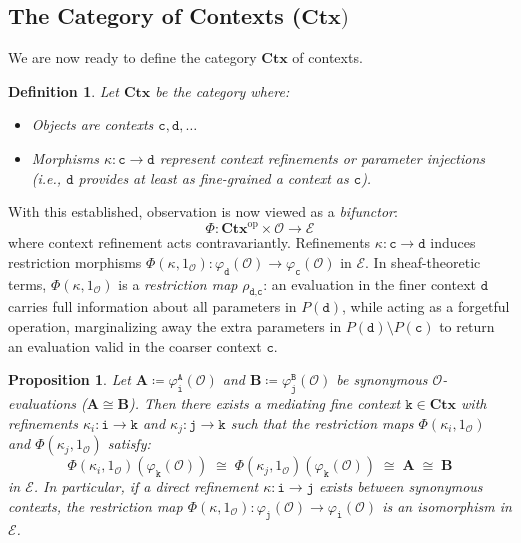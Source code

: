 \documentclass{article}
\newtheorem{dn}{Definition}
\newtheorem{pp}{Proposition}
\numberwithin{tm}{section}
\numberwithin{dn}{section}
\numberwithin{as}{section}
\numberwithin{rk}{section}
\numberwithin{lem}{section}
\numberwithin{ax}{section}
\numberwithin{pp}{section}
\numberwithin{eg}{section}
\numberwithin{war}{section}
\numberwithin{equation}{section}
\numberwithin{prop}{section}
\numberwithin{nt}{section}
\numberwithin{rc}{section}
\def\code#1{\texttt{#1}}
\begin{document}
\subsection{The Category of Contexts ($\mathbf{Ctx})$}
We are now ready to define the category $\mathbf{Ctx}$ of contexts.
\begin{dn}
	Let $\mathbf{Ctx}$ be the category where:
	\begin{itemize}
		\item Objects are contexts $\code{c}, \code{d}, \dots$
		\item Morphisms $\kappa: \code{c} \to \code{d}$ represent \emph{context refinements} or \emph{parameter injections} (i.e., $\code{d}$ provides at least as fine-grained a context as $\code{c}$).
	\end{itemize}
\end{dn}
With this established, observation is now viewed as a \emph{bifunctor}:
$$\Phi: \mathbf{Ctx}^{\text{op}} \times \mathcal{O} \longrightarrow \mathcal{E}$$
where context refinement acts contravariantly. Refinements $\kappa: \code{c} \to \code{d}$ induces restriction morphisms $\Phi(\kappa, 1_\mathcal{O}): \varphi_{\code{d}}(\mathcal{O}) \to \varphi_{\code{c}}(\mathcal{O})$ in $\mathcal{E}$. 	In sheaf-theoretic terms, $\Phi(\kappa, 1_\mathcal{O})$ is a \emph{restriction map} $\rho_{\code{d},\code{c}}$: an evaluation in the finer context $\code{d}$ carries full information about all parameters in $P(\code{d})$,
while acting as a forgetful operation, marginalizing away the extra parameters in $P(\code{d}) \setminus P(\code{c})$ to return an evaluation valid in the coarser context $\code{c}$.
\begin{pp}
	Let $\mathbf{A} \coloneq \varphi_{\code{i}}^\code{A}(\mathcal{O})$ and $\mathbf{B} \coloneq \varphi_{\code{j}}^\code{B}(\mathcal{O})$ be synonymous $\mathcal{O}$-evaluations ($\mathbf{A} \cong \mathbf{B}$). Then there exists a mediating fine context $\code{k} \in \mathbf{Ctx}$ with refinements $\kappa_i: \code{i} \to \code{k}$ and $\kappa_j: \code{j} \to \code{k}$ such that the restriction maps $\Phi(\kappa_i, 1_\mathcal{O})$ and $\Phi(\kappa_j, 1_\mathcal{O})$ satisfy:
	\[
	\Phi(\kappa_i, 1_\mathcal{O})\left(\varphi_{\code{k}}(\mathcal{O})\right) \;\cong\; \Phi(\kappa_j, 1_\mathcal{O})\left(\varphi_{\code{k}}(\mathcal{O})\right) \;\cong\; \mathbf{A} \;\cong\; \mathbf{B}
	\]
	in $\mathcal{E}$. In particular, if a direct refinement $\kappa: \code{i} \to \code{j}$ exists between synonymous contexts, the restriction map $\Phi(\kappa, 1_\mathcal{O}): \varphi_{\code{j}}(\mathcal{O}) \to \varphi_{\code{i}}(\mathcal{O})$ is an isomorphism in $\mathcal{E}$.
\end{pp}
\end{document}
